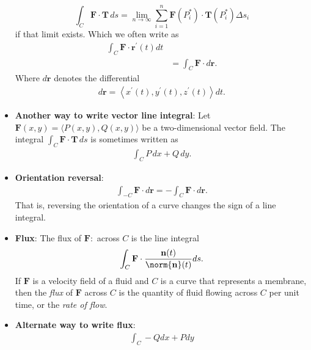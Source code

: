 \documentclass{report}
\begin{document}
\begin{itemize}
            \[
                \int_{C} \mathbf{F} \cdot \mathbf{T}\,ds = \lim_{n \to \infty} \sum_{i=1}^{n} \mathbf{F}(P_i^*) \cdot \mathbf{T}(P_i^*)\Delta s_i
            \]
            if that limit exists.
            \bigbreak \noindent 
            Which we often write as 
            \begin{align*}
                \int_C \mathbf{F} \cdot \mathbf{r^{\prime}}(t)dt \\
                &=\int_C \mathbf{F} \cdot d\mathbf{r}
            .\end{align*}
            \bigbreak \noindent 
            Where $d\mathbf{r}$ denotes the differential 
            \begin{align*}
                d\mathbf{r} = \left\langle x^{\prime}(t), y^{\prime}(t), z^{\prime}(t)\right\rangle dt
            .\end{align*}
        \item \textbf{Another way to write vector line integral}:
            Let $\mathbf{F}(x, y) = \langle P(x, y), Q(x, y) \rangle$ be a two-dimensional vector field. The integral $\int_{C} \mathbf{F} \cdot \mathbf{T}\,ds$ is sometimes written as 
            \begin{align*}
                \int_{C} P\,dx + Q\,dy
            .\end{align*}
        \item \textbf{Orientation reversal}:
            \begin{align*}
                \int_{-C} \mathbf{F} \cdot d\mathbf{r} = -\int_C \mathbf{F} \cdot d\mathbf{r}
            .\end{align*}
            \bigbreak \noindent 
            That is, reversing the orientation of a curve changes the sign of a line integral.
        \item \textbf{Flux}: The flux of $\mathbf{F}:$ across $C$ is the line integral
            \begin{align*}
                \int_C \mathbf{F} \cdot \frac{\mathbf{n}(t)}{\norm{\mathbf{n}}(t)}ds
            .\end{align*}
            \bigbreak \noindent 
            If $\mathbf{F}$ is a velocity field of a fluid and $C$ is a curve that represents a membrane, then the \textit{flux} of $\mathbf{F}$ across $C$ is the quantity of fluid flowing across $C$ per unit time, or the \textit{rate of flow}.
        \item \textbf{Alternate way to write flux}:
            \begin{align*}
                \int_C -Qdx + Pdy

\end{align*}
\end{itemize}
\end{document}
